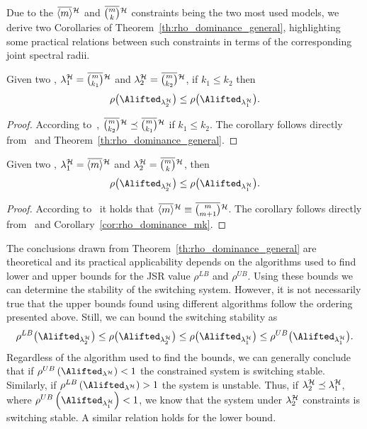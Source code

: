 Due to the $\overbar{\left< m \right>}^{\strat}$ and $\overbar{\binom{m}{k}}^{\strat}$ constraints being the two most used models, we derive two Corollaries of Theorem~\ref{th:rho_dominance_general}, highlighting some practical relations between such constraints in terms of the corresponding joint spectral radii.
\begin{corollary}%
    \label{cor:rho_dominance_mk}%
    Given two \ewhc{}, $\lambda^\strat_1 = \overbar{\binom{m}{k_1}}^{\strat}$ and $\lambda^\strat_2 = \overbar{\binom{m}{k_2}}^{\strat}$, if $k_1 \leq k_2$ then
    $$
        \rho\bigl(\Alifted_{\lambda^\strat_2}\bigr) \leq \rho\bigl(\Alifted_{\lambda^\strat_1}\bigr).
    $$
%
    \begin{proof}
        According to~\cite{Wu:2020}, $\overbar{\binom{m}{k_2}}^{\strat}\preceq\overbar{\binom{m}{k_1}}^{\strat}$ if $k_1 \leq k_2$.
        The corollary follows directly from~\cite{Wu:2020} and Theorem~\ref{th:rho_dominance_general}.
    \end{proof}
\end{corollary}
%
\begin{corollary}%
    \label{cor:rho_dominance_cons}%
    Given two \ewhc{}, $\lambda^\strat_1 = \overbar{\left<m\right>}^{\strat}$ and $\lambda^\strat_2 =\overbar{\binom{m}{k}}^{\strat}$, then
    $$
        \rho\bigl(\Alifted_{\lambda^\strat_2}\bigr) \leq \rho\bigl(\Alifted_{\lambda^\strat_1}\bigr).
    $$
%
    \begin{proof}
        According to~\cite{Maggio:2020} it holds that $\overbar{\left<m\right>}^{\strat} \equiv\overbar{\binom{m}{m+1}}^{\strat}$.
        The corollary follows directly from~\cite{Maggio:2020} and Corollary~\ref{cor:rho_dominance_mk}.
    \end{proof}
\end{corollary}
%
The conclusions drawn from Theorem~\ref{th:rho_dominance_general} are theoretical and its practical applicability depends on the algorithms used to find lower and upper bounds for the JSR value $\rho^{LB}$ and $\rho^{UB}$.
Using these bounds we can determine the stability of the switching system.
However, it is not necessarily true that the upper bounds found using different algorithms follow the ordering presented above.
Still, we can bound the switching stability as
%
$$
\rho^{LB} \bigl( \Alifted_{\lambda^\strat_2} \bigr) \leq \rho \bigl( \Alifted_{\lambda^\strat_2}
\bigr) \leq \rho \bigl( \Alifted_{\lambda^\strat_1} \bigr) \leq \rho^{UB} \bigl(
\Alifted_{\lambda^\strat_1} \bigr).
$$
%
Regardless of the algorithm used to find the bounds, we can generally conclude that if $\rho^{UB} \left( \Alifted_{\lambda^\strat} \right) < 1$ the constrained system is switching stable.
Similarly, if $\rho^{LB} \left( \Alifted_{\lambda^\strat} \right) > 1$ the system is unstable.
Thus, if $\lambda^{\mathcal{H}}_2 \preceq \lambda^{\mathcal{H}}_1$, where $\rho^{UB} \left( \Alifted_{\lambda^\strat_1} \right) < 1$, we know that the system under $\lambda^{\mathcal{H}}_2$ constraints is switching stable.
A similar relation holds for the lower bound.

